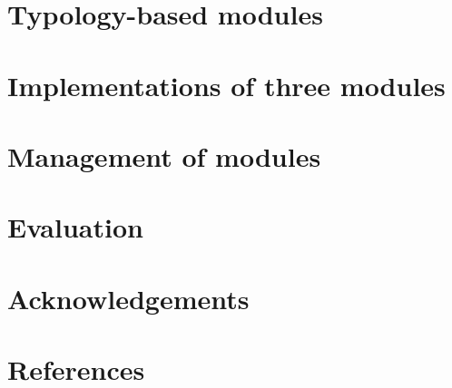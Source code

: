 \documentclass[11pt]{article}
\begin{document}
\section{Typology-based modules}


\section{Implementations of three modules}

\section{Management of modules}

\section{Evaluation}

\section*{Acknowledgements}

\section*{References}

%


\end{document}
